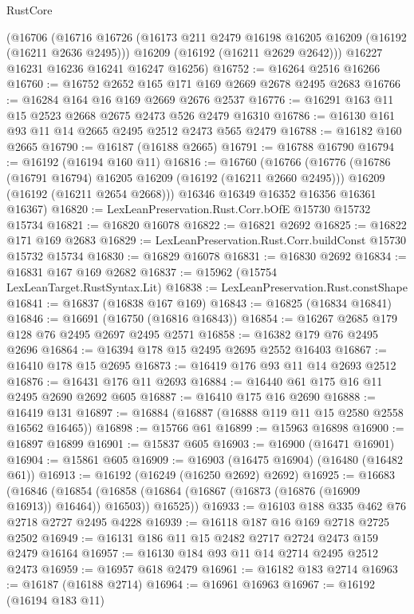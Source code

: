 \begin{lexlean}{RustCore}
\begin{coremodule}
    (@16706
      (@16716
        @16726
        (@16173 @211 @2479 @16198 @16205 @16209 (@16192 (@16211 @2636 @2495)))
        @16209
        (@16192 (@16211 @2629 @2642)))
      @16227
      @16231
      @16236
      @16241
      @16247
      @16256)
@16752 := @16264 @2516 @16266
@16760 := @16752 @2652 @165 @171 @169 @2669 @2678 @2495 @2683
@16766 := @16284 @164 @16 @169 @2669 @2676 @2537
@16776 := @16291 @163 @11 @15 @2523 @2668 @2675 @2473 @526 @2479 @16310
@16786 := @16130 @161 @93 @11 @14 @2665 @2495 @2512 @2473 @565 @2479
@16788 := @16182 @160 @2665
@16790 := @16187 (@16188 @2665)
@16791 := @16788 @16790
@16794 := @16192 (@16194 @160 @11)
@16816 := @16760
    (@16766
      (@16776
        (@16786 (@16791 @16794) @16205 @16209 (@16192 (@16211 @2660 @2495)))
        @16209
        (@16192 (@16211 @2654 @2668)))
      @16346
      @16349
      @16352
      @16356
      @16361
      @16367)
@16820 := LexLeanPreservation.Rust.Corr.bOfE @15730 @15732 @15734
@16821 := @16820 @16078
@16822 := @16821 @2692
@16825 := @16822 @171 @169 @2683
@16829 := LexLeanPreservation.Rust.Corr.buildConst @15730 @15732 @15734
@16830 := @16829 @16078
@16831 := @16830 @2692
@16834 := @16831 @167 @169 @2682
@16837 := @15962 (@15754 LexLeanTarget.RustSyntax.Lit)
@16838 := LexLeanPreservation.Rust.constShape
@16841 := @16837 (@16838 @167 @169)
@16843 := @16825 (@16834 @16841)
@16846 := @16691 (@16750 (@16816 @16843))
@16854 := @16267 @2685 @179 @128 @76 @2495 @2697 @2495 @2571
@16858 := @16382 @179 @76 @2495 @2696
@16864 := @16394 @178 @15 @2495 @2695 @2552 @16403
@16867 := @16410 @178 @15 @2695
@16873 := @16419 @176 @93 @11 @14 @2693 @2512
@16876 := @16431 @176 @11 @2693
@16884 := @16440 @61 @175 @16 @11 @2495 @2690 @2692 @605
@16887 := @16410 @175 @16 @2690
@16888 := @16419 @131
@16897 := @16884 (@16887 (@16888 @119 @11 @15 @2580 @2558 @16562 @16465))
@16898 := @15766 @61
@16899 := @15963 @16898
@16900 := @16897 @16899
@16901 := @15837 @605
@16903 := @16900 (@16471 @16901)
@16904 := @15861 @605
@16909 := @16903 (@16475 @16904) (@16480 (@16482 @61))
@16913 := @16192 (@16249 (@16250 @2692) @2692)
@16925 := @16683
    (@16846
      (@16854 (@16858 (@16864 (@16867 (@16873 (@16876 (@16909 @16913)) @16464)) @16503)) @16525))
@16933 := @16103 @188 @335 @462 @76 @2718 @2727 @2495 @4228
@16939 := @16118 @187 @16 @169 @2718 @2725 @2502
@16949 := @16131 @186 @11 @15 @2482 @2717 @2724 @2473 @159 @2479 @16164
@16957 := @16130 @184 @93 @11 @14 @2714 @2495 @2512 @2473
@16959 := @16957 @618 @2479
@16961 := @16182 @183 @2714
@16963 := @16187 (@16188 @2714)
@16964 := @16961 @16963
@16967 := @16192 (@16194 @183 @11)

\end{coremodule}
\end{lexlean}
